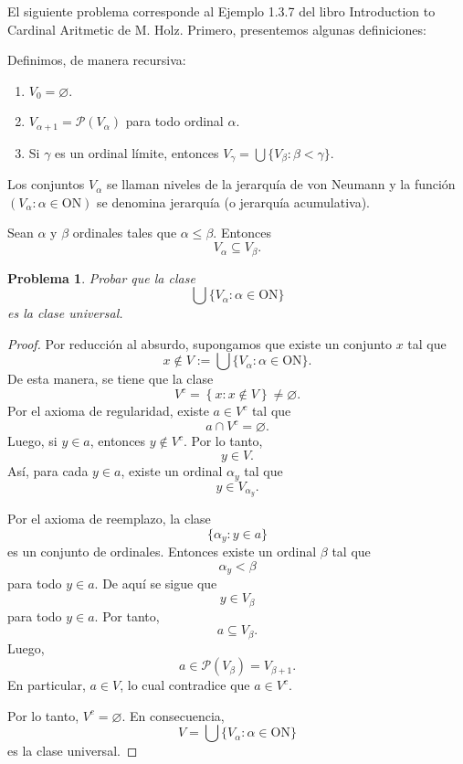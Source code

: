 \documentclass[a4,10pt]{aleph-notas}
\newtheorem*{prob}{Problema}
\begin{document}
\encabezado

\noindent
El siguiente problema corresponde al Ejemplo 1.3.7 del libro Introduction to Cardinal Aritmetic de M. Holz. Primero, presentemos algunas definiciones:

\begin{defi}
    Definimos, de manera recursiva:
    \begin{enumerate}
        \item $V_0=\varnothing$.
        \item $V_{\alpha+1}=\mathcal{P}(V_\alpha)$ para todo ordinal $\alpha$.
        \item Si $\gamma$ es un ordinal límite, entonces $V_\gamma=\bigcup\{V_\beta:\beta<\gamma\}$.
    \end{enumerate}
    Los conjuntos $V_\alpha$ se llaman niveles de la jerarquía de von Neumann y la función $(V_\alpha:\alpha\in\mathrm{ON})$ se denomina jerarquía (o jerarquía acumulativa).
\end{defi}

\begin{lem}
    Sean \(\alpha\) y \(\beta\) ordinales tales que \(\alpha\leq \beta\). Entonces
    \[
        V_\alpha\subseteq V_\beta.
    \]
\end{lem}

\begin{prob}
    Probar que la clase 
    \[
        \bigcup\{V_\alpha:\alpha\in\mathrm{ON}\}
    \]
    es la clase universal.
\end{prob}

\begin{proof}
Por reducción al absurdo, supongamos que existe un conjunto \(x\) tal que
\[
    x\notin V := \bigcup\{V_\alpha:\alpha\in\mathrm{ON}\}.
\]
De esta manera, se tiene que la clase
\[
    V^{c}=\left\{x:x\notin V\right\} \neq \varnothing.
\]
Por el axioma de regularidad, existe \(a\in V^c\) tal que
\[
    a\cap V^c=\varnothing.
\]
Luego, si \(y\in a\), entonces \(y\notin V^c\). Por lo tanto,
\[
    y\in V.
\]
Así, para cada \(y\in a\), existe un ordinal \(\alpha_y\) tal que
\[
    y\in V_{\alpha_y}.
\]

Por el axioma de reemplazo, la clase
\[
    \{\alpha_y:y\in a\}
\]
es un conjunto de ordinales. Entonces existe un ordinal \(\beta\) tal que
\[
    \alpha_y<\beta
\]
para todo \(y\in a\). De aquí se sigue que
\[
    y\in V_\beta
\]
para todo \(y\in a\). Por tanto,
\[
    a\subseteq V_\beta.
\]
Luego,
\[
    a\in \mathcal{P}(V_\beta)=V_{\beta+1}.
\]
En particular, \(a\in V\), lo cual contradice que \(a\in V^c\).

Por lo tanto, \(V^c=\varnothing\). En consecuencia,
\[
    V=\bigcup\{V_\alpha:\alpha\in\mathrm{ON}\}
\]
es la clase universal.
\end{proof}
\end{document}
